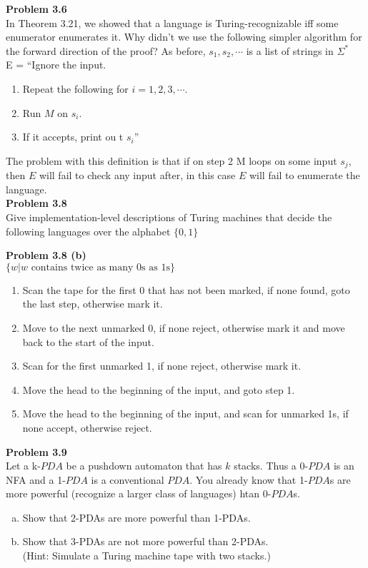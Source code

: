 \documentclass{article}
\newcommand\curl[1]{\{#1\}}
\newcommand{\problem}[1]{\large{\textbf{Problem #1}}\\}
\begin{document}
\problem{3.6}
In Theorem 3.21, we showed that a language is Turing-recognizable iff some enumerator
enumerates it. Why didn't we use the following simpler algorithm for the forward direction
of the proof? As before, $s_1,s_2,\cdots$ is a list of strings in $\Sigma^*$ \\

E = ``Ignore the input.
\begin{enumerate}[1., leftmargin = 1.5cm]
\itemsep0em
\item Repeat the following for $i = 1,2,3,\cdots$.
\item Run $M$ on $s_i$.
\item If it accepts, print ou t $s_i$''
\end{enumerate}

The problem with this definition is that if on step 2 M loops on some input 
$s_j$, then $E$ will fail to check any input after, in this case $E$ will
fail to enumerate the language.  \\
\problem{3.8}

Give implementation-level descriptions of Turing machines that decide the 
following languages over the alphabet $\curl{0,1}$

\problem{3.8   (b)}
$\curl{w | w \text{ contains twice as many 0s as 1s}}$ \\

\begin{enumerate}[1., leftmargin = 1.5cm]
\itemsep0em
\item Scan the tape for the first 0 that has not been marked, if 
none found, goto the last step, otherwise mark it.
\item Move to the next unmarked 0, if none reject, otherwise mark it and
move back to the start of the input.
\item Scan for the first unmarked 1, if none reject, otherwise mark it.
\item  Move the head to the beginning of the input, and goto step 1.
\item Move the head to the beginning of the input, and scan for unmarked
1s, if none accept, otherwise reject.
\end{enumerate}
\problem{3.9}
Let a k-$PDA$ be a pushdown automaton that has $k$ stacks. Thus a 0-$PDA$
is an NFA and a 1-$PDA$ is a conventional $PDA$. You already know that 1-$PDA$s
are more powerful (recognize a larger class of languages) htan 0-$PDA$s.
\begin{enumerate}[a., leftmargin = 1.5cm]
\itemsep0em
\item Show that 2-PDAs are more powerful than 1-PDAs.
\item Show that 3-PDAs are not more powerful than 2-PDAs.\\
    (Hint: Simulate a Turing machine tape with two stacks.)
\end{enumerate}
\end{document}
